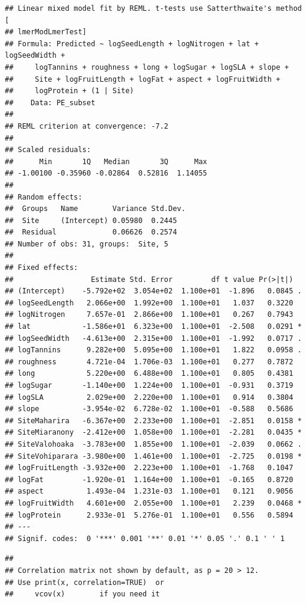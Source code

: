 \documentclass[
  12pt,
]{article}
\begin{document}
\begin{verbatim}
## Linear mixed model fit by REML. t-tests use Satterthwaite's method [
## lmerModLmerTest]
## Formula: Predicted ~ logSeedLength + logNitrogen + lat + logSeedWidth +  
##     logTannins + roughness + long + logSugar + logSLA + slope +  
##     Site + logFruitLength + logFat + aspect + logFruitWidth +  
##     logProtein + (1 | Site)
##    Data: PE_subset
## 
## REML criterion at convergence: -7.2
## 
## Scaled residuals: 
##      Min       1Q   Median       3Q      Max 
## -1.00100 -0.35960 -0.02864  0.52816  1.14055 
## 
## Random effects:
##  Groups   Name        Variance Std.Dev.
##  Site     (Intercept) 0.05980  0.2445  
##  Residual             0.06626  0.2574  
## Number of obs: 31, groups:  Site, 5
## 
## Fixed effects:
##                  Estimate Std. Error         df t value Pr(>|t|)  
## (Intercept)    -5.792e+02  3.054e+02  1.100e+01  -1.896   0.0845 .
## logSeedLength   2.066e+00  1.992e+00  1.100e+01   1.037   0.3220  
## logNitrogen     7.657e-01  2.866e+00  1.100e+01   0.267   0.7943  
## lat            -1.586e+01  6.323e+00  1.100e+01  -2.508   0.0291 *
## logSeedWidth   -4.613e+00  2.315e+00  1.100e+01  -1.992   0.0717 .
## logTannins      9.282e+00  5.095e+00  1.100e+01   1.822   0.0958 .
## roughness       4.721e-04  1.706e-03  1.100e+01   0.277   0.7872  
## long            5.220e+00  6.488e+00  1.100e+01   0.805   0.4381  
## logSugar       -1.140e+00  1.224e+00  1.100e+01  -0.931   0.3719  
## logSLA          2.029e+00  2.220e+00  1.100e+01   0.914   0.3804  
## slope          -3.954e-02  6.728e-02  1.100e+01  -0.588   0.5686  
## SiteMaharira   -6.367e+00  2.233e+00  1.100e+01  -2.851   0.0158 *
## SiteMiaranony  -2.412e+00  1.058e+00  1.100e+01  -2.281   0.0435 *
## SiteValohoaka  -3.783e+00  1.855e+00  1.100e+01  -2.039   0.0662 .
## SiteVohiparara -3.980e+00  1.461e+00  1.100e+01  -2.725   0.0198 *
## logFruitLength -3.932e+00  2.223e+00  1.100e+01  -1.768   0.1047  
## logFat         -1.920e-01  1.164e+00  1.100e+01  -0.165   0.8720  
## aspect          1.493e-04  1.231e-03  1.100e+01   0.121   0.9056  
## logFruitWidth   4.601e+00  2.055e+00  1.100e+01   2.239   0.0468 *
## logProtein      2.933e-01  5.276e-01  1.100e+01   0.556   0.5894  
## ---
## Signif. codes:  0 '***' 0.001 '**' 0.01 '*' 0.05 '.' 0.1 ' ' 1
\end{verbatim}

\begin{verbatim}
## 
## Correlation matrix not shown by default, as p = 20 > 12.
## Use print(x, correlation=TRUE)  or
##     vcov(x)        if you need it
\end{verbatim}
\end{document}
